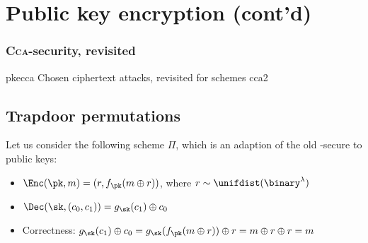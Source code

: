 \section{Public key encryption (cont'd)} 

\subsubsection{\textsc{Cca}-security, revisited}

\begin{cryptogame}
    {pkecca}
    {Chosen ciphertext attacks, revisited for \pke{} schemes}
    {cca2}
    

    \cseqdelay
    \cseqbeginloop


    \cseqendloop
    \cseqdelay



    \cseqdelay
    \cseqbeginloop


    \cseqendloop
    \cseqdelay

\end{cryptogame}

\subsection{Trapdoor permutations}

Let us consider the following scheme $\Pi$, which is an adaption of the old \cpa-secure \ske{} to public keys:
\begin{itemize}
    \item $\Enc(\pk, m) = (r, f_\pk(m \oplus r))$, where $r \sim \unifdist(\binary^\lambda)$
    \item $\Dec(\sk, (c_0, c_1)) = g_\sk(c_1) \oplus c_0$
    \item Correctness: $g_\sk(c_1) \oplus c_0 = g_\sk(f_\pk (m \oplus r)) \oplus r = m \oplus r \oplus r = m$
\end{itemize}

